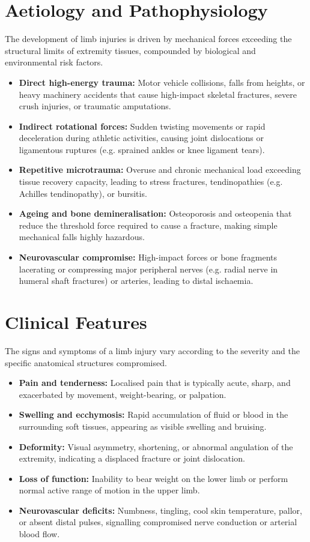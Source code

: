 \section*{Aetiology and Pathophysiology}
The development of limb injuries is driven by mechanical forces exceeding the structural limits of extremity tissues, compounded by biological and environmental risk factors.
\begin{itemize}
    \item \textbf{Direct high-energy trauma:} Motor vehicle collisions, falls from heights, or heavy machinery accidents that cause high-impact skeletal fractures, severe crush injuries, or traumatic amputations.
    \item \textbf{Indirect rotational forces:} Sudden twisting movements or rapid deceleration during athletic activities, causing joint dislocations or ligamentous ruptures (e.g. sprained ankles or knee ligament tears).
    \item \textbf{Repetitive microtrauma:} Overuse and chronic mechanical load exceeding tissue recovery capacity, leading to stress fractures, tendinopathies (e.g. Achilles tendinopathy), or bursitis.
    \item \textbf{Ageing and bone demineralisation:} Osteoporosis and osteopenia that reduce the threshold force required to cause a fracture, making simple mechanical falls highly hazardous.
    \item \textbf{Neurovascular compromise:} High-impact forces or bone fragments lacerating or compressing major peripheral nerves (e.g. radial nerve in humeral shaft fractures) or arteries, leading to distal ischaemia.
\end{itemize}

\section*{Clinical Features}
The signs and symptoms of a limb injury vary according to the severity and the specific anatomical structures compromised.
\begin{itemize}
    \item \textbf{Pain and tenderness:} Localised pain that is typically acute, sharp, and exacerbated by movement, weight-bearing, or palpation.
    \item \textbf{Swelling and ecchymosis:} Rapid accumulation of fluid or blood in the surrounding soft tissues, appearing as visible swelling and bruising.
    \item \textbf{Deformity:} Visual asymmetry, shortening, or abnormal angulation of the extremity, indicating a displaced fracture or joint dislocation.
    \item \textbf{Loss of function:} Inability to bear weight on the lower limb or perform normal active range of motion in the upper limb.
    \item \textbf{Neurovascular deficits:} Numbness, tingling, cool skin temperature, pallor, or absent distal pulses, signalling compromised nerve conduction or arterial blood flow.
\end{itemize}

